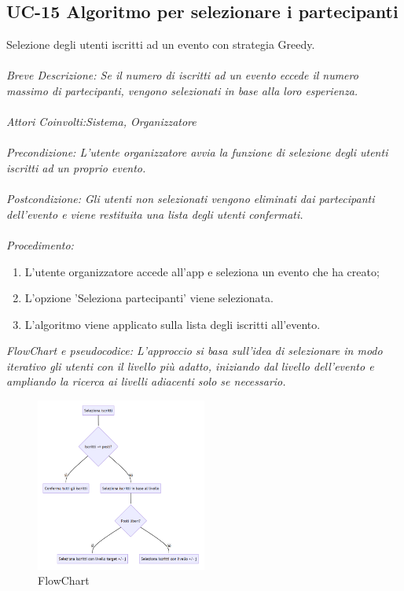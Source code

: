 \subsection{UC-15 Algoritmo per selezionare i partecipanti}
Selezione degli utenti iscritti ad un evento con strategia Greedy.
\\
\\
\textit{Breve Descrizione: Se il numero di iscritti ad un evento eccede il numero massimo di partecipanti, vengono selezionati in base alla loro esperienza.} 
\\
\\
\textit{Attori Coinvolti:Sistema, Organizzatore}
\\
\\
\textit{Precondizione: L'utente organizzatore avvia la funzione di selezione degli utenti iscritti ad un proprio evento.}
\\
\\
\textit{Postcondizione: Gli utenti non selezionati vengono eliminati dai partecipanti dell'evento e viene restituita una lista degli utenti confermati.}
\\
\\
\textit{Procedimento:}
\begin{enumerate}
	\item L'utente organizzatore accede all'app e seleziona un evento che ha creato;
 	\item L'opzione 'Seleziona partecipanti' viene selezionata.
	\item L'algoritmo viene applicato sulla lista degli iscritti all'evento.
\end{enumerate}
\textit{FlowChart e pseudocodice: L'approccio si basa sull'idea di selezionare in modo iterativo gli utenti con il livello più
adatto, iniziando dal livello dell'evento e ampliando la ricerca ai livelli adiacenti solo se
necessario.}
\\
\begin{figure}[htb]
    \centering
    \includegraphics[width = 0.5\textwidth]{Iterazione 2/images/flowchart.png}
    \caption{FlowChart}
	\label{fig:FlowChart}
\end{figure}
